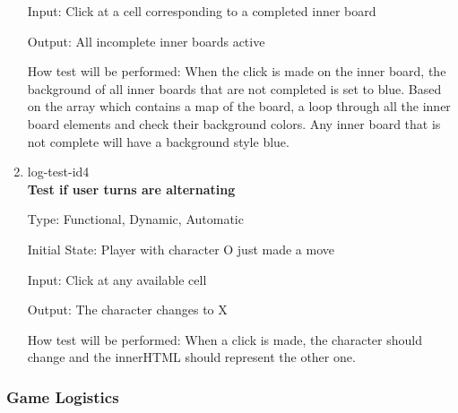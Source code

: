 \documentclass[12pt, titlepage]{article}
\begin{document}
\begin{enumerate}
Input: Click at a cell corresponding to a completed inner board
					
Output: All incomplete inner boards active
					
How test will be performed: When the click is made on the inner board, the
background of all inner boards that are not completed is set to blue. Based on
the array which contains a map of the board, a loop through all the inner
board elements and check their background colors. Any inner board that is not
complete will have a background style blue.

\item{log-test-id4\\}
\textbf{Test if user turns are alternating}

Type: Functional, Dynamic, Automatic
					
Initial State: Player with character O just made a move

Input: Click at any available cell
					
Output: The character changes to X
					
How test will be performed: When a click is made, the character should change
and the innerHTML should represent the other one.

\end{enumerate}

\subsubsection{Game Logistics}
\end{document}
